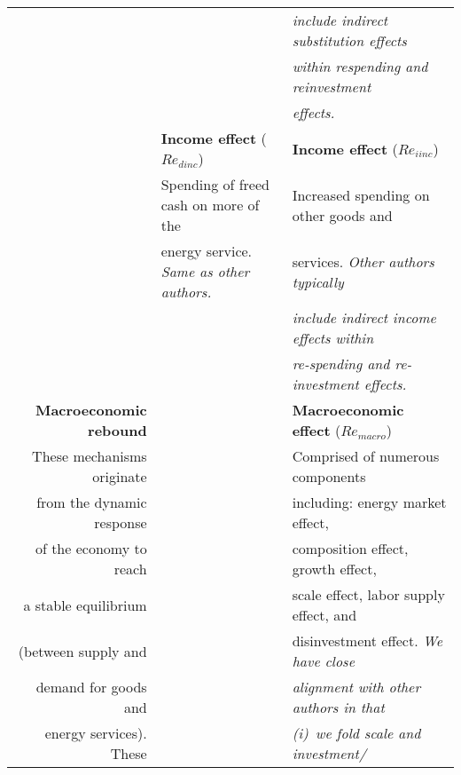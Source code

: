 \begin{table}
\begin{center}
\begin{tabular}{ r l l }
                                   &                                             & \emph{include indirect substitution effects} \\
                                   &                                             & \emph{within respending and reinvestment} \\ 
                                   &                                             & \emph{effects.} \\ 
                                   \cmidrule{2-3}
                                   & \textbf{Income effect} ($Re_{dinc}$)        & \textbf{Income effect} ($Re_{iinc}$) \\
                                   & Spending of freed cash on more of the       & Increased spending on other goods and \\
                                   & energy service. \emph{Same as other authors.} & services. \emph{Other authors typically} \\
                                   &                                             & \emph{include indirect income effects within} \\ 
                                   &                                             & \emph{re-spending and re-investment effects.} \\
                                   \cmidrule{2-3}
\textbf{Macroeconomic rebound}     &                                             & \textbf{Macroeconomic effect} ($Re_{macro}$) \\
These mechanisms originate         &                                             & Comprised of numerous components \\
from the dynamic response          &                                             & including: energy market effect, \\
of the economy to reach            &                                             & composition effect, growth effect, \\
a stable equilibrium               &                                             & scale effect, labor supply effect, and \\
(between supply and                &                                             & disinvestment effect. \emph{We have close} \\
demand for goods and               &                                             & \emph{alignment with other authors in that} \\
energy services). These            &                                             & \emph{(i)~we fold scale and investment/} \\

\end{tabular}
\end{center}
\end{table}
